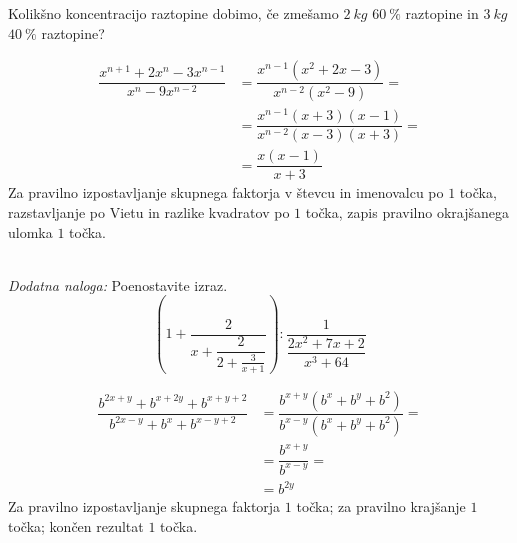 \documentclass[addpoints]{exam}
\begin{document}
\begin{questions}
        \newpage


        \question[4]
        Kolikšno koncentracijo raztopine dobimo, če zmešamo $2~kg$ $60~\%$ raztopine in $3~kg$ $40~\%$ raztopine?



        \begin{solution}[6cm]
            \begin{align*}
                \dfrac{x^{n+1}+2x^n-3x^{n-1}}{x^n-9x^{n-2}} &= \dfrac{x^{n-1}(x^{2}+2x-3)}{x^{n-2}(x^2-9)}= \\
                                                            &= \dfrac{x^{n-1}(x+3)(x-1)}{x^{n-2}(x-3)(x+3)}= \\
                                                            &= \dfrac{x(x-1)}{x+3}
            \end{align*}
            Za pravilno izpostavljanje skupnega faktorja v števcu in imenovalcu po $1$ točka, razstavljanje po Vietu in razlike kvadratov po $1$ točka, zapis pravilno okrajšanega ulomka $1$ točka.
        \end{solution}
     ~\\


    \bonusquestion[4]
    \textit{Dodatna naloga:} Poenostavite izraz. $$\left(1+\dfrac{2}{x+\dfrac{2}{2+\frac{3}{x+1}}}\right):\dfrac{1}{\dfrac{2x^2+7x+2}{x^3+64}}$$

    \begin{solution}[7cm]
        \begin{align*}
            \dfrac{b^{2x+y}+b^{x+2y}+b^{x+y+2}}{b^{2x-y}+b^x+b^{x-y+2}} &= \dfrac{b^{x+y}(b^x+b^y+b^2)}{b^{x-y}(b^x+b^y+b^2)}= \\
                                                                        &= \dfrac{b^{x+y}}{b^{x-y}}= \\
                                                                        &= b^{2y}
        \end{align*}
        Za pravilno izpostavljanje skupnega faktorja $1$ točka; za pravilno krajšanje $1$ točka; končen rezultat $1$ točka.
    \end{solution}




\end{questions}
\end{document}
